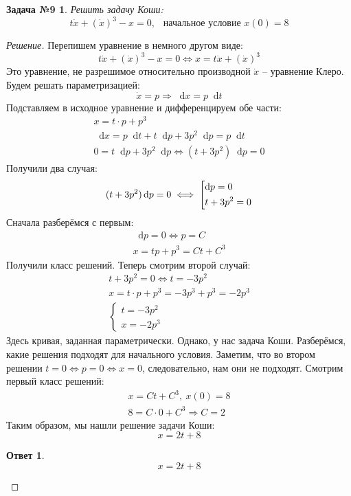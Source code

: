 \documentclass[a4paper,12pt]{article}
\newtheorem*{task9}{Задача №9}
\newtheorem*{ans}{Ответ}
\renewcommand*\d{\mathop{}\!\mathrm{d}}
\newcommand{\dx}{\dot{x}}
\newcommand{\bto}{\Longrightarrow}
\begin{document}
\begin{task9}
	Решить задачу Коши:
	\[t\dx + (\dx)^3 - x = 0,\ \ \text{ начальное условие } x(0) = 8\]
\end{task9}
\begin{proof}[Решение]
	Перепишем уравнение в немного другом виде:
	\[t\dx + (\dx)^3 - x = 0 \iff x = t\dx + (\dx)^3\]	
	Это уравнение, не разрешимое относительно производной $\dx$ -- уравнение Клеро. Будем решать параметризацией:
	\[\dx = p \bto \d x = p\d t\]
	Подставляем в исходное уравнение и дифференцируем обе части:
	\begin{gather*}
	x = t\cdot p + p^3 \\
	\d x = p\d t + t\d p + 3p^2\d p = p\d t\\
	0 = t\d p + 3p^2\d p \iff (t + 3p^2)\d p = 0
	\end{gather*}
	Получили два случая:
	\[(t + 3p^2)\d p = 0 \iff \left[\begin{gathered}
	\d p = 0\hfill\\
	t + 3p^2 = 0 \hfill
	\end{gathered}\right.\]
	Сначала разберёмся с первым:
	\begin{gather*}
	\d p = 0 \iff p = C\\
	x = tp + p^3 = Ct + C^3
	\end{gather*}
	Получили класс решений. Теперь смотрим второй случай:
	\begin{gather*}
	t + 3p^2 = 0 \iff t = -3p^2\\
	x = t\cdot p + p^3 = -3p^3 + p^3 = -2p^3\\
	\begin{cases}
	t = -3p^2\\
	x = -2p^3
	\end{cases}
	\end{gather*}
	Здесь кривая, заданная параметрически.
	Однако, у нас задача Коши. Разберёмся, какие решения подходят для начального условия. Заметим, что во втором решении $t = 0 \iff p = 0 \iff x = 0$, следовательно, нам они не подходят. Смотрим первый класс решений:
	\begin{gather*}
	x = Ct + C^3,\ x(0) = 8\\
	8 = C \cdot 0 + C^3 \bto C = 2
	\end{gather*}
	Таким образом, мы нашли решение задачи Коши:
	\[x = 2t + 8\]
	
	\begin{ans}
		\[x = 2t + 8\]
	\end{ans}
\end{proof}
\end{document}
